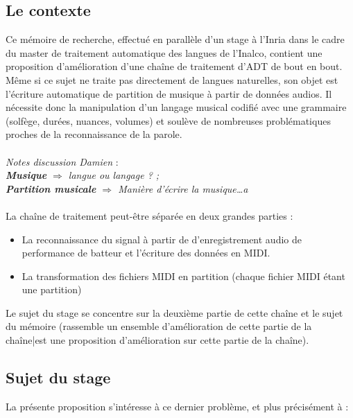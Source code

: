 \subsection*{Le contexte}
Ce mémoire de recherche, effectué en parallèle d’un stage à l’Inria dans le cadre du master de traitement automatique des langues de l’Inalco, contient une proposition d’amélioration d’une chaîne de traitement d’ADT de bout en bout.\\
Même si ce sujet ne traite pas directement de langues naturelles, son objet est l’écriture automatique de partition de musique à partir de données audios. Il nécessite donc la manipulation d’un langage musical codifié avec une grammaire (solfège, durées, nuances, volumes) et soulève de nombreuses problématiques proches de la reconnaissance de la parole.\\\\
\textit{Notes discussion Damien} :\\
\textit{\textbf{Musique} $\Rightarrow$ langue ou langage ? ;\\
\textbf{Partition musicale} $\Rightarrow$ Manière d’écrire la musique…a}\\\\
La chaîne de traitement peut-être séparée en deux grandes parties :
\begin{itemize}
	\item La reconnaissance du signal à partir de d’enregistrement audio de performance de batteur et l’écriture des données en MIDI.
	\item La transformation des fichiers MIDI en partition (chaque fichier MIDI étant une partition)\\
\end{itemize}

Le sujet du stage se concentre sur la deuxième partie de cette chaîne et le sujet du mémoire (rassemble un ensemble d’amélioration de cette partie de la chaîne|est une proposition d’amélioration sur cette partie de la chaîne).

\subsection*{Sujet du stage}

La présente proposition s'intéresse à ce dernier problème, et plus précisément à :\\

